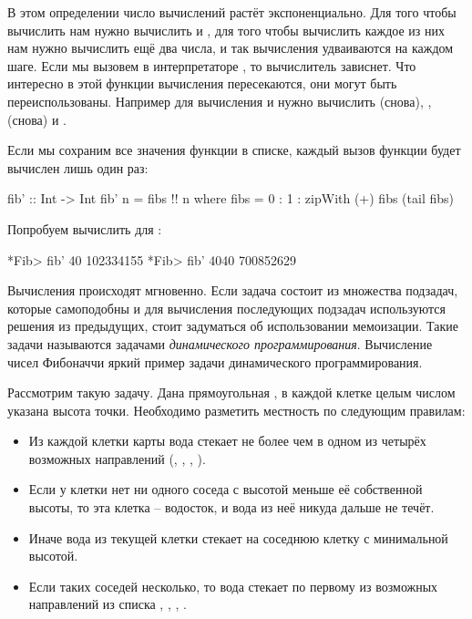 В этом определении число вычислений
растёт экспоненциально. Для того чтобы вычислить  нам
нужно вычислить  и , для того чтобы вычислить
каждое из них нам нужно вычислить ещё два числа, и так вычисления 
удваиваются на каждом шаге. Если мы вызовем в интерпретаторе ,
то вычислитель зависнет. Что интересно в этой функции вычисления 
пересекаются, они могут быть переиспользованы. Например для вычисления
 и  нужно вычислить  (снова),
,  (снова) и . 

Если мы сохраним все значения функции в списке, каждый вызов
функции будет вычислен лишь один раз:

\begin{code}
fib' :: Int -> Int
fib' n = fibs !! n
    where fibs = 0 : 1 : zipWith (+) fibs (tail fibs)
\end{code}

Попробуем вычислить для :

\begin{code}
*Fib> fib' 40
102334155
*Fib> fib' 4040
700852629
\end{code}

Вычисления происходят мгновенно. Если 
задача состоит из множества подзадач, которые самоподобны
и для вычисления последующих подзадач используются решения из предыдущих, 
стоит задуматься об использовании мемоизации. Такие задачи 
называются задачами \emph{динамического программирования}. 
Вычисление чисел Фибоначчи яркий пример задачи динамического
программирования. 

Рассмотрим такую задачу. Дана прямоугольная 
, в каждой клетке целым числом указана
высота точки. Необходимо разметить местность по следующим
правилам:

\begin{itemize}
\item Из каждой клетки карты вода стекает
    не более чем в одном из четырёх возможных направлений
    (, , , ).
        
\item Если у клетки нет ни одного соседа с высотой меньше её собственной
    высоты, то эта клетка -- водосток, и вода из неё никуда
    дальше не течёт. 
        
\item Иначе вода из текущей клетки стекает на соседнюю клетку 
    с минимальной высотой.

\item Если таких соседей несколько, то вода стекает по первому 
    из возможных направлений из списка 
    , , 
    , .
\end{itemize}

